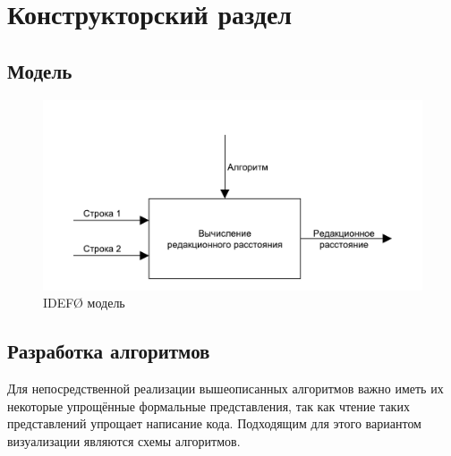 \chapter{Конструкторский раздел}
\label{cha:design}

\section{Модель}
\begin{figure}
    \centering
    \includegraphics{pdf/mainIdef0.pdf}
    \caption{IDEF\O{} модель}
\end{figure}

\section{Разработка алгоритмов}
Для непосредственной реализации вышеописанных алгоритмов важно иметь их некоторые упрощённые формальные представления, так как чтение таких представлений упрощает написание кода. Подходящим для этого вариантом визуализации являются схемы алгоритмов.

